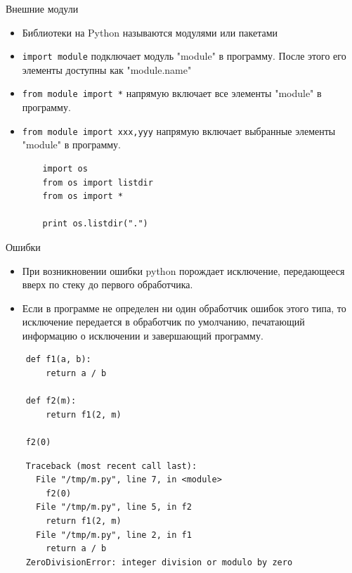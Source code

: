 \documentclass{article}
\begin{document}
\begin{center} Внешние модули \end{center}
\begin{itemize}
    \item Библиотеки на Python называются модулями или пакетами
    \item \lstinline$import module$ подключает модуль "module" в программу. 
    После этого его элементы доступны как "module.name"
    \item \lstinline$from module import *$ напрямую включает все элементы "module" в программу. 
    \item \lstinline$from module import xxx,yyy$
        напрямую включает выбранные элементы "module" в программу. 
\vspace{15pt}

\begin{lstlisting}
    import os
    from os import listdir
    from os import *

    print os.listdir(".")
\end{lstlisting}
\end{itemize}
\newpage

\begin{center} Ошибки \end{center}
\begin{itemize}
    \item При возникновении ошибки python порождает исключение, 
    			передающееся вверх по стеку до первого обработчика.
    \item Если в программе не определен ни один обработчик ошибок этого типа, то исключение
    			передается в обработчик по умолчанию, печатающий информацию о исключении
    			и завершающий программу.
\end{itemize}

{
\Large
\begin{lstlisting}
    def f1(a, b):
        return a / b

    def f2(m):
        return f1(2, m)

    f2(0)
\end{lstlisting}

\begin{lstlisting}
    Traceback (most recent call last):
      File "/tmp/m.py", line 7, in <module>
        f2(0)
      File "/tmp/m.py", line 5, in f2
        return f1(2, m)
      File "/tmp/m.py", line 2, in f1
        return a / b
    ZeroDivisionError: integer division or modulo by zero
\end{lstlisting}
}
\end{document}
